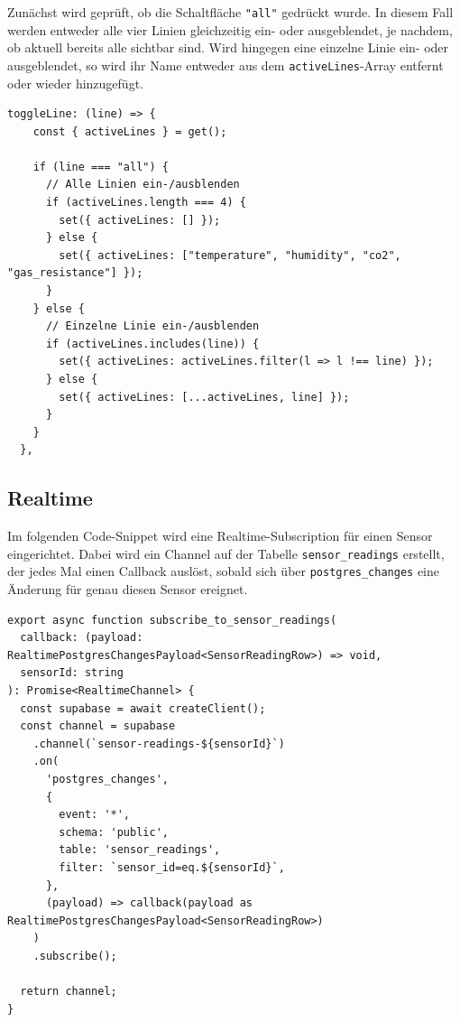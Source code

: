 \begin{inhalt}
\begin{enumerate}[label=\textbf{\arabic*.}]
Zunächst wird geprüft, ob die Schaltfläche \texttt{"all"} gedrückt wurde. In diesem Fall werden entweder alle vier Linien gleichzeitig ein- oder ausgeblendet, je nachdem, ob aktuell bereits alle sichtbar sind.
Wird hingegen eine einzelne Linie ein- oder ausgeblendet, so wird ihr Name entweder aus dem \texttt{activeLines}-Array entfernt oder wieder hinzugefügt.

\begin{lstlisting}[language=mytsx]
toggleLine: (line) => {
    const { activeLines } = get();
    
    if (line === "all") {
      // Alle Linien ein-/ausblenden
      if (activeLines.length === 4) {
        set({ activeLines: [] });
      } else {
        set({ activeLines: ["temperature", "humidity", "co2", "gas_resistance"] });
      }
    } else {
      // Einzelne Linie ein-/ausblenden
      if (activeLines.includes(line)) {
        set({ activeLines: activeLines.filter(l => l !== line) });
      } else {
        set({ activeLines: [...activeLines, line] });
      }
    }
  },
\end{lstlisting}







\subsection{Realtime}
\label{ref:realtime-sensor}

Im folgenden Code-Snippet wird eine Realtime-Subscription für einen Sensor eingerichtet.  
Dabei wird ein Channel auf der Tabelle \texttt{sensor\_readings} erstellt, der jedes Mal einen Callback auslöst, sobald sich über \texttt{postgres\_changes} eine Änderung für genau diesen Sensor ereignet.

\begin{lstlisting}[language=mytsx]
export async function subscribe_to_sensor_readings(
  callback: (payload: RealtimePostgresChangesPayload<SensorReadingRow>) => void,
  sensorId: string
): Promise<RealtimeChannel> {
  const supabase = await createClient();
  const channel = supabase
    .channel(`sensor-readings-${sensorId}`)
    .on(
      'postgres_changes',
      {
        event: '*',
        schema: 'public',
        table: 'sensor_readings',
        filter: `sensor_id=eq.${sensorId}`,
      },
      (payload) => callback(payload as RealtimePostgresChangesPayload<SensorReadingRow>)
    )
    .subscribe();
  
  return channel;
}
\end{lstlisting}



\end{enumerate}
\end{inhalt}
